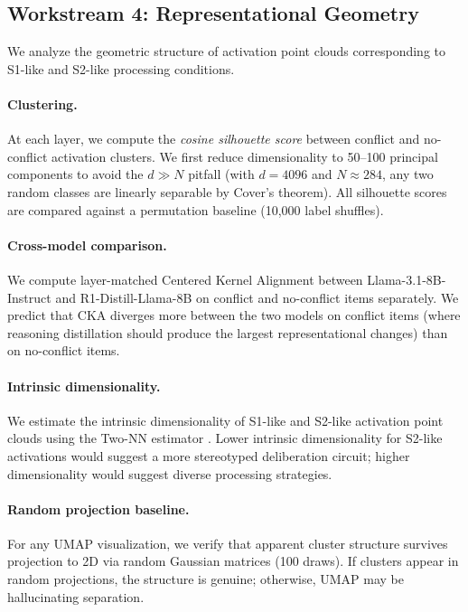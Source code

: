 \subsection{Workstream 4: Representational Geometry}
\label{sec:geometry}

We analyze the geometric structure of activation point clouds corresponding to
S1-like and S2-like processing conditions.

\paragraph{Clustering.}  At each layer, we compute the \emph{cosine
silhouette score} between conflict and no-conflict activation clusters.  We
first reduce dimensionality to 50--100 principal components to avoid the
$d \gg N$ pitfall (with $d = 4096$ and $N \approx 284$, any two random
classes are linearly separable by Cover's theorem).  All silhouette scores
are compared against a permutation baseline (10,000 label shuffles).

\paragraph{Cross-model comparison.}  We compute layer-matched Centered Kernel
Alignment \citep[CKA;][]{kornblith2019similarity} between
Llama-3.1-8B-Instruct and R1-Distill-Llama-8B on conflict and no-conflict
items separately.  We predict that CKA diverges more between the two models
on conflict items (where reasoning distillation should produce the largest
representational changes) than on no-conflict items.

\paragraph{Intrinsic dimensionality.}  We estimate the intrinsic
dimensionality of S1-like and S2-like activation point clouds using the
Two-NN estimator \citep{facco2017estimating}.  Lower intrinsic
dimensionality for S2-like activations would suggest a more stereotyped
deliberation circuit; higher dimensionality would suggest diverse processing
strategies.

\paragraph{Random projection baseline.}  For any UMAP visualization, we
verify that apparent cluster structure survives projection to 2D via random
Gaussian matrices (100 draws).  If clusters appear in random projections,
the structure is genuine; otherwise, UMAP may be hallucinating separation.

